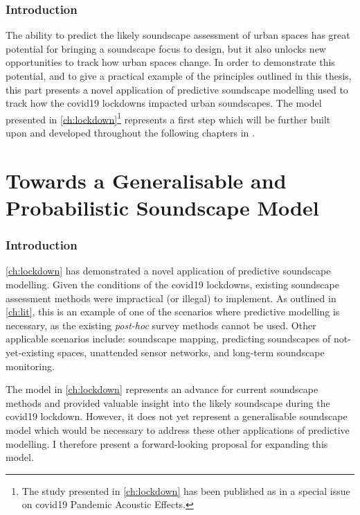 \documentclass[oneside,fontsize=11pt,titlepage,chapterprefix=true
]{scrbook}
\begin{document}
\section*{Introduction}

The ability to predict the likely soundscape assessment of urban spaces has great potential for bringing a soundscape focus to design, but it also unlocks new opportunities to track how urban spaces change. In order to demonstrate this potential, and to give a practical example of the principles outlined in this thesis, this part presents a novel application of predictive soundscape modelling used to track how the \gls{covid19} lockdowns impacted urban soundscapes. The model presented in \cref{ch:lockdown}\footnote{The study presented in \cref{ch:lockdown} has been published as \citep{Mitchell2021Investigating} in a special issue on \gls{covid19} Pandemic Acoustic Effects. } represents a first step which will be further built upon and developed throughout the following chapters in \cref{part:generalModel}.




\part{Towards a Generalisable and Probabilistic Soundscape Model}
\label{part:generalModel}
\section*{Introduction}
\cref{ch:lockdown} has demonstrated a novel application of predictive soundscape modelling. Given the conditions of the \gls{covid19} lockdowns, existing soundscape assessment methods were impractical (or illegal) to implement. As outlined in \cref{ch:lit}, this is an example of one of the scenarios where predictive modelling is necessary, as the existing \emph{post-hoc} survey methods cannot be used. Other applicable scenarios include: soundscape mapping, predicting soundscapes of not-yet-existing spaces, unattended sensor networks, and long-term soundscape monitoring.

The model in \cref{ch:lockdown} represents an advance for current soundscape methods and provided valuable insight into the likely soundscape during the \gls{covid19} lockdown. However, it does not yet represent a generalisable soundscape model which would be necessary to address these other applications of predictive modelling. I therefore present a forward-looking proposal for expanding this model.
\end{document}
